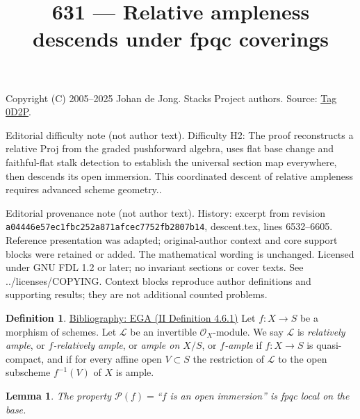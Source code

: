\documentclass{amsart}
\newenvironment{reference}{\comment}{\endcomment}
\theoremstyle{plain}
\newtheorem{lemma}[subsection]{Lemma}
\theoremstyle{definition}
\newtheorem{definition}[subsection]{Definition}
\theoremstyle{remark}
\numberwithin{equation}{subsection}
\begin{document}
\title[Stacks Project, Tag 0D2P]{631 --- Relative ampleness descends under fpqc coverings}
\maketitle
\noindent Copyright (C) 2005--2025 Johan de Jong. Stacks Project authors. Source: \href{https://stacks.math.columbia.edu/tag/0D2P}{Tag 0D2P}.

\noindent Editorial difficulty note (not author text). Difficulty H2: The proof reconstructs a relative Proj from the graded pushforward algebra, uses flat base change and faithful-flat stalk detection to establish the universal section map everywhere, then descends its open immersion. This coordinated descent of relative ampleness requires advanced scheme geometry..

\noindent Editorial provenance note (not author text). History: excerpt from revision \texttt{a0444\allowbreak 6e57e\allowbreak c1fbc\allowbreak 252a8\allowbreak 71afc\allowbreak ec775\allowbreak 2fb28\allowbreak 07b14}, descent.tex, lines 6532--6605. Reference presentation was adapted; original-author context and core support blocks were retained or added. The mathematical wording is unchanged. Licensed under GNU FDL 1.2 or later; no invariant sections or cover texts. See ../licenses/COPYING. Context blocks reproduce author definitions and supporting results; they are not additional counted problems.

\begin{definition}
\label{morphisms-definition-relatively-ample}
\begin{reference}
\href{https://stacks.math.columbia.edu/bibliography}{Bibliography: EGA (II Definition 4.6.1)}
\end{reference}
Let $f : X \to S$ be a morphism of schemes.
Let $\mathcal{L}$ be an invertible $\mathcal{O}_X$-module.
We say $\mathcal{L}$ is {\it relatively ample}, or {\it $f$-relatively ample},
or {\it ample on $X/S$}, or {\it $f$-ample} if $f : X \to S$
is quasi-compact, and if for every affine open $V \subset S$
the restriction of $\mathcal{L}$ to the open subscheme
$f^{-1}(V)$ of $X$ is ample.
\end{definition}

\begin{lemma}
\label{lemma-descending-property-open-immersion}
The property $\mathcal{P}(f) =$``$f$ is an open immersion''
is fpqc local on the base.
\end{lemma}
\end{document}

